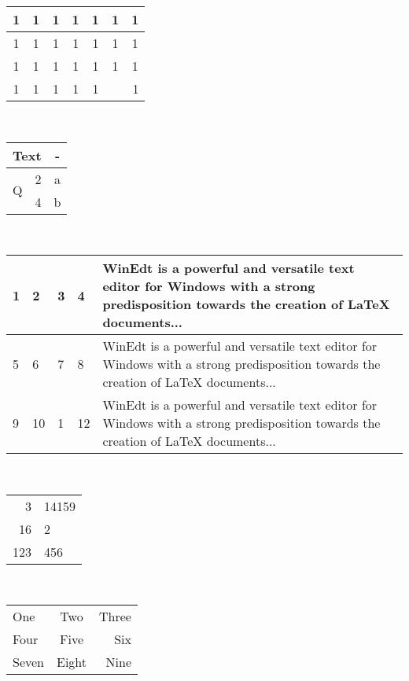 \documentclass[12pt,a4paper]{article}
\begin{document}
\begin{center}



{
\begin{tabular}{|c|c|c|c|c|c|c|}
  \hline
  1 & 1 & 1 & 1 & 1 & 1 & 1 \\
  \hline
  1 & 1 & {\cellcolor{red}1} & 1 & 1 & {\cellcolor[gray]{0.7}1} & 1 \\
  \hline
  1 & 1 & 1 & 1 & 1 & 1 & 1 \\
  \hline
  1 & 1 & 1 & 1 & 1 & \multicolumn{2}{|r|}{\cellcolor[rgb]{0.8,0.5,1}1} \\
  \hline
\end{tabular}
}
\\[30pt]

\begin{tabular}{|c||c|c|}
  \hline
  \multicolumn{2}{|l|}{Text} & - \\
  \hline
  \multirow{2}{0.5cm}{Q} & 2 & a\\
  \cline{2-3}
  & 4 & b\\
  \hline
\end{tabular}
\\[30pt]


\begin{tabular}{|p{0.5cm}|p{0.5cm}|p{0.5cm}|p{0.5cm}|p{8cm}|}
  \hline
  1 & 2 & 3 & 4 & WinEdt is a powerful and versatile text editor for Windows with a strong predisposition towards the creation of LaTeX documents... \\
  \hline
  5 & 6 & 7 & 8 & WinEdt is a powerful and versatile text editor for Windows with a strong predisposition towards the creation of LaTeX documents... \\
  \hline
  9 & 10 & 1 & 12 & WinEdt is a powerful and versatile text editor for Windows with a strong predisposition towards the creation of LaTeX documents... \\
  \hline
\end{tabular}
\\[30pt]

\begin{tabular}{r@{.}l}
3 & 14159 \\
16 & 2 \\
123 & 456 \\
\end{tabular}
\\[30pt]

\begin{tabular}{|l|c||r|}
  \hline
  One & Two & Three \\
  \cline{1-1}
  Four & Five & Six \\
  \cline{3-3}
  Seven & Eight & Nine \\
  \hline
\end{tabular}
\\[30pt]

\end{center}
\end{document}
